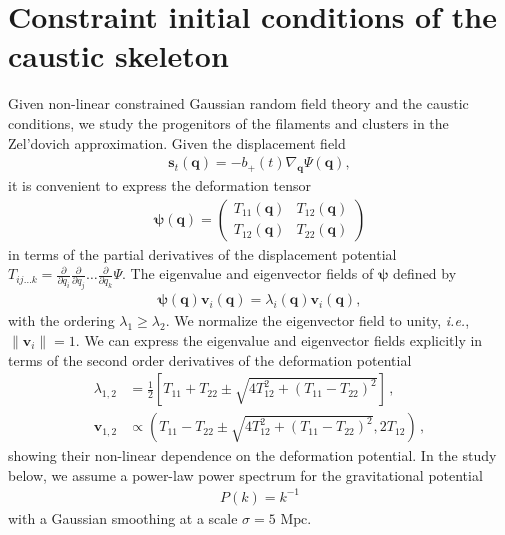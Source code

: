 \documentclass[a4paper, 11pt]{article}
\begin{document}
\section{Constraint initial conditions of the caustic skeleton}
Given non-linear constrained Gaussian random field theory and the caustic conditions, we study the progenitors of the filaments and clusters in the Zel'dovich approximation. Given the displacement field 
\begin{align}
\bm{s}_t(\bm{q}) = -b_+(t) \nabla_{\bm{q}} \Psi(\bm{q}),
\end{align}
it is convenient to express the deformation tensor
\begin{align}
\bm{\psi}(\bm{q}) = \begin{pmatrix} T_{11}(\bm{q}) & T_{12}(\bm{q}) \\ T_{12}(\bm{q}) & T_{22}(\bm{q})\end{pmatrix}
\end{align}
in terms of the partial derivatives of the displacement potential $T_{ij\dots k}=\frac{\partial}{\partial q_i}\frac{\partial}{\partial q_j}\dots \frac{\partial}{\partial q_k}\Psi$. The eigenvalue and eigenvector fields of $\bm{\psi}$ defined by
\begin{align}
\bm{\psi}(\bm{q}) \bm{v}_i(\bm{q}) = \lambda_i(\bm{q}) \bm{v}_i(\bm{q}),
\end{align}
with the ordering $\lambda_1\geq \lambda_2$. We normalize the eigenvector field to unity, \textit{i.e.}, $\|\bm{v}_{i}\|=1$. We can express the eigenvalue and eigenvector fields explicitly in terms of the second order derivatives of the deformation potential
\begin{align}
\lambda_{1,2} &= \frac{1}{2}\left[T_{11}+T_{22} \pm \sqrt{4 T_{12}^2+(T_{11}-T_{22})^2}\right]\,,\\
\bm{v}_{1,2} &\propto \left(T_{11}-T_{22} \pm \sqrt{4 T_{12}^2+(T_{11}-T_{22})^2}, 2 T_{12}\right)\,,
\end{align}
showing their non-linear dependence on the deformation potential. In the study below, we assume a power-law power spectrum for the gravitational potential
\begin{align}
P(k)=k^{-1}
\end{align}
with a Gaussian smoothing at a scale $\sigma = 5 \text{ Mpc}$.

\end{document}
